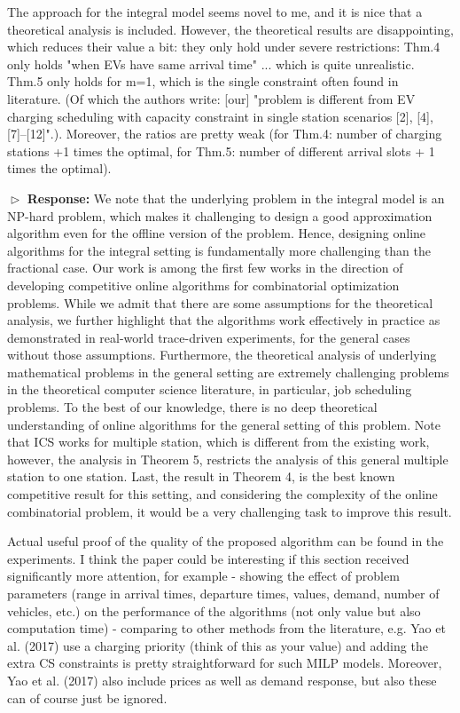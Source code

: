 \documentclass[11pt]{article}
\begin{document}
\vspace{3mm}
{\color{blue} The approach for the integral model seems novel to me, and it is nice that a theoretical analysis is included. However, the theoretical results are disappointing, which reduces their value a bit: they only hold under severe restrictions: Thm.4 only holds "when EVs have same arrival time" ... which is quite unrealistic. Thm.5 only holds for m=1, which is the single constraint often found in literature. (Of which the authors write: [our] "problem is different from EV charging scheduling with capacity constraint in single station scenarios [2], [4], [7]–[12]".). Moreover, the ratios are pretty weak (for Thm.4: number of charging stations +1 times the optimal, for Thm.5: number of different arrival slots + 1 times the optimal). }
\vspace{3mm}

$\vartriangleright$ \noindent\textbf{Response:} We note that the underlying problem in the integral model is an NP-hard problem, which makes it challenging to design a good approximation algorithm even for the offline version of the problem. Hence, designing online algorithms for the integral setting is fundamentally more challenging than the fractional case. Our work is among the first few works in the direction of developing competitive online algorithms for combinatorial optimization problems. While we admit that there are some assumptions for the theoretical analysis, we further highlight that the algorithms work effectively in practice as demonstrated in real-world trace-driven experiments, for the general cases without those assumptions. Furthermore, the theoretical analysis of underlying mathematical problems in the general setting are extremely challenging problems in the theoretical computer science literature, in particular, job scheduling problems. To the best of our knowledge, there is no deep theoretical understanding of online algorithms for the general setting of this problem. Note that ICS works for multiple station, which is different from the existing work, however, the analysis in Theorem 5, restricts the analysis of this general multiple station to one station. Last, the result in Theorem 4, is the best known competitive result for this setting, and considering the complexity of the online combinatorial problem, it would be a very challenging task to improve this result. 

\vspace{3mm}
{\color{blue} Actual useful proof of the quality of the proposed algorithm can be found in the experiments. I think the paper could be interesting if this section received significantly more attention, for example
 - showing the effect of problem parameters (range in arrival times, departure times, values, demand, number of vehicles, etc.) on the performance of the  algorithms (not only value but also computation time)
 - comparing to other methods from the literature, e.g. Yao et al. (2017) use a charging priority (think of this as your value) and adding the extra CS constraints is pretty straightforward for such MILP models. Moreover, Yao et al. (2017) also include prices as well as demand response, but also these can of course just be ignored.
 }
\vspace{3mm}
\end{document}
